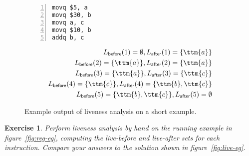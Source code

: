 \documentclass[7x10]{TimesAPriori_MIT}%
\newtheorem{exercise}[theorem]{Exercise}
\numberwithin{theorem}{chapter}
\numberwithin{definition}{chapter}
\numberwithin{equation}{chapter}
\begin{document}
\begin{figure}[tbp]
  \centering
  \begin{tcolorbox}[colback=white]
    \hspace{10pt}
  \begin{minipage}{0.4\textwidth}
\begin{lstlisting}[numbers=left,numberstyle=\tiny]
movq $5, a
movq $30, b
movq a, c
movq $10, b
addq b, c
\end{lstlisting}
\end{minipage}
\vrule\hspace{10pt}
\begin{minipage}{0.45\textwidth}
\begin{align*}
L_{\mathsf{before}}(1)=  \emptyset, 
L_{\mathsf{after}}(1)=  \{\ttm{a}\}\\
L_{\mathsf{before}}(2)=  \{\ttm{a}\},
L_{\mathsf{after}}(2)=  \{\ttm{a}\}\\
L_{\mathsf{before}}(3)=  \{\ttm{a}\},
L_{\mathsf{after}}(3)=  \{\ttm{c}\}\\
L_{\mathsf{before}}(4)=  \{\ttm{c}\},
L_{\mathsf{after}}(4)=  \{\ttm{b},\ttm{c}\}\\
L_{\mathsf{before}}(5)=  \{\ttm{b},\ttm{c}\},
L_{\mathsf{after}}(5)=  \emptyset
\end{align*}
\end{minipage}
\end{tcolorbox}
\caption{Example output of liveness analysis on a short example.}
\label{fig:liveness-example-0}
\end{figure}

\begin{exercise}\normalfont\normalsize
  Perform liveness analysis by hand on the running example in
  figure~\ref{fig:reg-eg}, computing the live-before and live-after
  sets for each instruction. Compare your answers to the solution
  shown in figure~\ref{fig:live-eg}.
\end{exercise}
\end{document}
